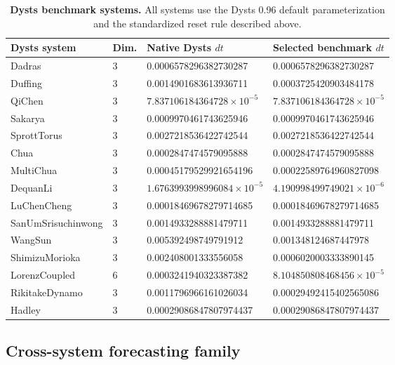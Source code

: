 \begin{table}[ht]
\centering
\scriptsize
\setlength{\tabcolsep}{4pt}
\begin{tabular}{p{}p{}p{}p{}}
\toprule
Dysts system & Dim. & Native Dysts $dt$ & Selected benchmark $dt$ \\
\midrule
Dadras & 3 & 0.0006578296382730287 & 0.0006578296382730287 \\
Duffing & 3 & 0.0014901683613936711 & 0.0003725420903484178 \\
QiChen & 3 & $7.837106184364728 \times 10^{-5}$ & $7.837106184364728 \times 10^{-5}$ \\
Sakarya & 3 & 0.0009970461743625946 & 0.0009970461743625946 \\
SprottTorus & 3 & 0.0027218536422742544 & 0.0027218536422742544 \\
Chua & 3 & 0.0002847474579095888 & 0.0002847474579095888 \\
MultiChua & 3 & 0.00045179529921654196 & 0.00022589764960827098 \\
DequanLi & 3 & $1.6763993998996084 \times 10^{-5}$ & $4.190998499749021 \times 10^{-6}$ \\
LuChenCheng & 3 & 0.00018469678279714685 & 0.00018469678279714685 \\
SanUmSrisuchinwong & 3 & 0.0014933288881479711 & 0.0014933288881479711 \\
WangSun & 3 & 0.005392498749791912 & 0.001348124687447978 \\
ShimizuMorioka & 3 & 0.002408001333556058 & 0.0006020003333890145 \\
LorenzCoupled & 6 & 0.0003241940323387382 & $8.104850808468456 \times 10^{-5}$ \\
RikitakeDynamo & 3 & 0.0011796966161026034 & 0.00029492415402565086 \\
Hadley & 3 & 0.00029086847807974437 & 0.00029086847807974437 \\
\bottomrule
\end{tabular}
\caption{\textbf{Dysts benchmark systems.} All systems use the Dysts 0.96 default parameterization and the standardized reset rule described above.}
\label{tab:review-dysts-systems-20260314}
\end{table}

\subsection{Cross-system forecasting family}

